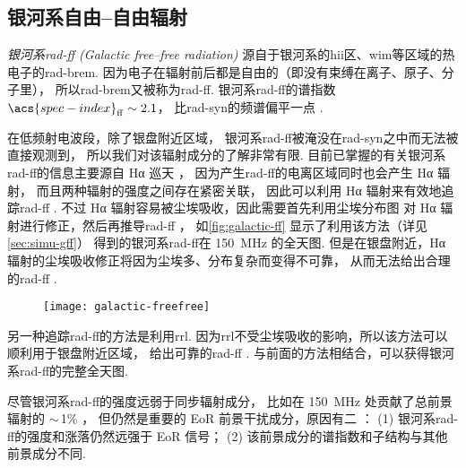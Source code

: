 \subsection{银河系自由--自由辐射}

\emph{银河系\acs{rad-ff} (Galactic free--free radiation)}
源自于银河系的\ac{hii}区、\ac{wim}等区域的热电子的\ac{rad-brem}.
因为电子在辐射前后都是自由的（即没有束缚在离子、原子、分子里），
所以\ac{rad-brem}又被称为\ac{rad-ff}.
银河系\ac{rad-ff}的谱指数 $\acs{spec-index}_{\R{ff}} \sim 2.1$，
比\ac{rad-syn}的频谱偏平一点 \cite{dickinson2003}.

在低频射电波段，除了银盘附近区域，
银河系\ac{rad-ff}被淹没在\ac{rad-syn}之中而无法被直接观测到，
所以我们对该辐射成分的了解非常有限.
目前已掌握的有关银河系\ac{rad-ff}的信息主要源自 Hα 巡天 \cite{finkbeiner2003}，
因为产生\ac{rad-ff}的电离区域同时也会产生 Hα 辐射，
而且两种辐射的强度之间存在紧密关联，
因此可以利用 Hα 辐射来有效地追踪\ac{rad-ff} \cite{smoot1998,dickinson2003}.
不过 Hα 辐射容易被尘埃吸收，因此需要首先利用尘埃分布图\cite{schlegel1998}
对 Hα 辐射进行修正，然后再推导\ac{rad-ff} \cite{dickinson2003}，
如\autoref{fig:galactic-ff} 显示了利用该方法（详见 \autoref{sec:simu-gff}）
得到的银河系\ac{rad-ff}在 \SI{150}{\MHz} 的全天图.
但是在银盘附近，Hα 辐射的尘埃吸收修正将因为尘埃多、分布复杂而变得不可靠，
从而无法给出合理的\ac{rad-ff} \cite{dickinson2003}.

\begin{figure}[htp]
  \centering
  \texttt{[image: galactic-freefree]}
  \label{fig:galactic-ff}
\end{figure}

另一种追踪\ac{rad-ff}的方法是利用\ac{rrl}.
因为\ac{rrl}不受尘埃吸收的影响，所以该方法可以顺利用于银盘附近区域，
给出可靠的\ac{rad-ff} \cite{alves2010,alves2012}.
与前面的方法相结合，可以获得银河系\ac{rad-ff}的完整全天图.

尽管银河系\ac{rad-ff}的强度远弱于同步辐射成分，
比如在 \SI{150}{\MHz} 处贡献了总前景辐射的 $\sim$\,1\% \cite{shaver1999}，
但仍然是重要的 EoR 前景干扰成分，原因有二 \cite{jelic2008}：
(1) 银河系\ac{rad-ff}的强度和涨落仍然远强于 EoR 信号；
(2) 该前景成分的谱指数和子结构与其他前景成分不同.


